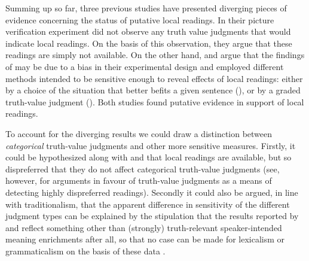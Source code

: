 \documentclass[fleqn,reqno,10pt,draft]{article}
\begin{document}
Summing up so far, three previous studies have presented diverging
pieces of evidence concerning the status of putative local
readings. In their picture verification experiment
\citet{GeurtsPouscoulous2009:Embedded-Implic} did not observe any
truth value judgments that would indicate local readings. On the basis
of this observation, they argue that these readings are simply not
available. On the other hand,
\citeauthor{CliftonDube2010:Embedded-Implic} and
\citeauthor{ChemlaSpector2010:Experimental-Ev} argue that the findings
of \citeauthor{GeurtsPouscoulous2009:Embedded-Implic} may be due to a
bias in their experimental design and employed different methods
intended to be sensitive enough to reveal effects of local readings:
either by a choice of the situation that better befits a given
sentence (\citeauthor{CliftonDube2010:Embedded-Implic}), or by a
graded truth-value judgment
(\citeauthor{ChemlaSpector2010:Experimental-Ev}). Both studies found
putative evidence in support of local readings.

To account for the diverging results we could draw a distinction
between \emph{categorical} truth-value judgments and other more
sensitive measures. Firstly, it could be hypothesized along with
\citeauthor{CliftonDube2010:Embedded-Implic} and
\citeauthor{ChemlaSpector2010:Experimental-Ev} that local readings are
available, but so dispreferred that they do not affect categorical
truth-value judgments (see, however, \citet{Crain1998} for arguments
in favour of truth-value judgments as a means of detecting highly
dispreferred readings).  Secondly it could also be argued, in line
with traditionalism, that the apparent difference in sensitivity of
the different judgment types can be explained by the stipulation that
the results reported by \citeauthor{CliftonDube2010:Embedded-Implic}
and \citeauthor{ChemlaSpector2010:Experimental-Ev} reflect something
other than (strongly) truth-relevant speaker-intended meaning
enrichments after all, so that no case can be made for lexicalism or
grammaticalism on the basis of these data \citep[c.f.][for arguments
along these lines]{Tielvan-Tiel2012:Embedded-Scalar}.
\end{document}
